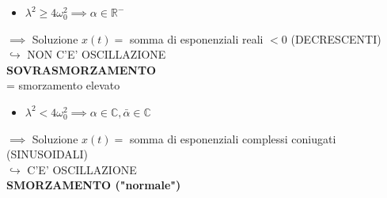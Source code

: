 \documentclass{article}
\begin{document}
\vspace{0.5cm}
\noindent
\begin{minipage}[t]{0.48\textwidth}
\begin{itemize}
\item $\lambda^2 \ge 4\omega_0^2 \implies \alpha \in \mathbb{R}^-$
\end{itemize}
$\implies$ Soluzione $x(t) =$ somma di esponenziali reali $<0$ (DECRESCENTI) \\
$\hookrightarrow$ NON C'E' OSCILLAZIONE\\
\textbf{SOVRASMORZAMENTO}\\
= smorzamento elevato
\end{minipage}
\hfill
\begin{minipage}[t]{0.48\textwidth}
\begin{itemize}
\item $\lambda^2 < 4\omega_0^2 \implies \alpha \in \mathbb{C}, \bar{\alpha} \in \mathbb{C}$
\end{itemize}
$\implies$ Soluzione $x(t) =$ somma di esponenziali complessi coniugati (SINUSOIDALI) \\
$\hookrightarrow$ C'E' OSCILLAZIONE\\
\textbf{SMORZAMENTO ("normale")}
\end{minipage}
\end{document}
